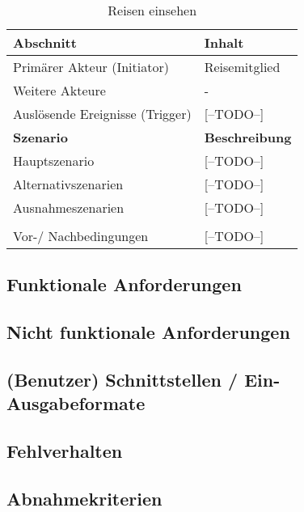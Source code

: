 \begin{table}[H]
\caption{Reisen einsehen}
\begin{tabularx}{0.95\textwidth}{ |X|X| }
\hline
\rowcolor{gray} \textbf{Abschnitt} & \textbf{Inhalt} \\
\hline
	Primärer Akteur (Initiator) & Reisemitglied \\
\hline
	Weitere Akteure & - \\
\hline
	Auslösende Ereignisse (Trigger) & [--TODO--] \\

\hline
\rowcolor{lightgray} \textbf{Szenario} & \textbf{Beschreibung} \\
\hline
	Hauptszenario & [--TODO--] \\
\hline
  	Alternativszenarien & [--TODO--] \\
\hline
  	Ausnahmeszenarien & [--TODO--] \\
\hline
\rowcolor{lightgray} & \\
\hline
  	Vor-/ Nachbedingungen & [--TODO--] \\
\hline
\end{tabularx}
\end{table}


\subsection{Funktionale Anforderungen}

\subsection{ Nicht funktionale Anforderungen}

\subsection{(Benutzer) Schnittstellen / Ein-Ausgabeformate}

\subsection{Fehlverhalten}

\subsection{Abnahmekriterien}